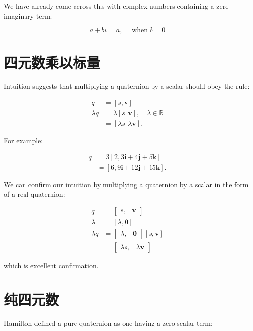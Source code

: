 We have already come across this with complex numbers containing a zero imaginary term:

$$
    a+b i=a, \quad \text { when } b=0
$$

\section{四元数乘以标量}
Intuition suggests that multiplying a quaternion by a scalar should obey the rule:

$$
    \begin{aligned}
        q         & =[s, \mathbf{v}]                                      \\
        \lambda q & =\lambda[s, \mathbf{v}], \quad \lambda \in \mathbb{R} \\
                  & =[\lambda s, \lambda \mathbf{v}] .
    \end{aligned}
$$

For example:

$$
    \begin{aligned}
        q & =3[2,3 \mathbf{i}+4 \mathbf{j}+5 \mathbf{k}]    \\
          & =[6,9 \mathbf{i}+12 \mathbf{j}+15 \mathbf{k}] .
    \end{aligned}
$$

We can confirm our intuition by multiplying a quaternion by a scalar in the form of a real quaternion:

$$
    \begin{aligned}
        q         & =\left[\begin{array}{ll}
                s, & \mathbf{v}
            \end{array}\right]                \\
        \lambda   & =[\lambda, \mathbf{0}]                                  \\
        \lambda q & =\left[\begin{array}{ll}
                \lambda, & \mathbf{0}
            \end{array}\right][s, \mathbf{v}] \\
                  & =\left[\begin{array}{ll}
                \lambda s, & \lambda \mathbf{v}
            \end{array}\right]
    \end{aligned}
$$

which is excellent confirmation.

\section{纯四元数}
Hamilton defined a pure quaternion as one having a zero scalar term:

